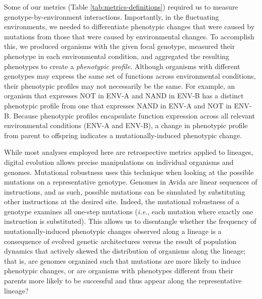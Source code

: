 \begin{raggedbottom}
Some of our metrics (Table \ref{tab:metrics-definitions}) required us to measure genotype-by-environment interactions.
Importantly, in the fluctuating environments, we needed to differentiate phenotypic changes that were caused by mutations from those that were caused by environmental changes.
To accomplish this, we produced organisms with the given focal genotype, measured their phenotype in each environmental condition, and aggregated the resulting phenotypes to create a \textit{phenotypic profile}.
Although organisms with different genotypes may express the same set of functions across environmental conditions, their phenotypic profiles may not necessarily be the same.
For example, an organism that expresses NOT in ENV-A and NAND in ENV-B has a distinct phenotypic profile from one that expresses NAND in ENV-A and NOT in ENV-B.
Because phenotypic profiles encapsulate function expression across all relevant environmental conditions (ENV-A and ENV-B), a change in phenotypic profile from parent to offspring indicates a mutationally-induced phenotypic change.  

While most analyses employed here are retrospective metrics applied to lineages, digital evolution allows precise manipulations on individual organisms and genomes.
Mutational robustness uses this technique when looking at the possible mutations on a representative genotype.
Genomes in Avida are linear sequences of instructions, and as such, possible mutations can be simulated by substituting other instructions at the desired site.
Indeed, the mutational robustness of a genotype examines all one-step mutations (\textit{i.e.}, each mutation where exactly one instruction is substituted).
This allows us to disentangle whether the frequency of mutationally-induced phenotypic changes observed along a lineage is a consequence of evolved genetic architectures versus the result of population dynamics that actively skewed the distribution of organisms along the lineage; that is, are genomes organized such that mutations are more likely to induce phenotypic changes, or are organisms with phenotypes different from their parents more likely to be successful and thus appear along the representative lineage?




\end{raggedbottom}
